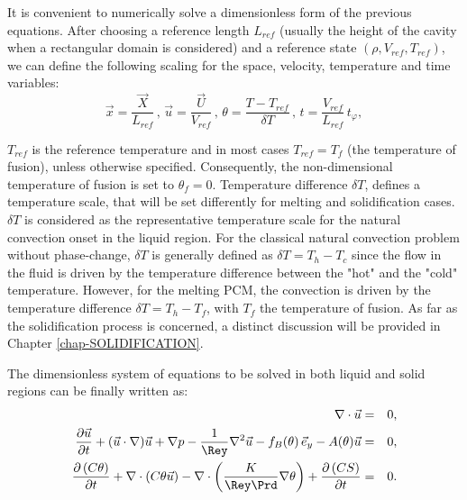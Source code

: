 It is convenient to numerically solve a dimensionless form of the previous equations.
After choosing a reference length $L_{ref}$ (usually the height of the cavity when a rectangular domain is considered) and a reference state $(\rho, V_{ref}, T_{ref})$, we can define the following scaling for the space, velocity, temperature and time variables:
\begin{equation}\label{eq-adim}
\vec{x} = \frac{\vec{X}}{L_{ref}} \, , \,  \vec{u} = \frac{\vec{U}}{V_{ref}} \, , \,  \theta = \frac{T-T_{ref}}{\delta T} \, , \,  t = \frac{V_{ref}}{L_{ref}} \, t_{\varphi},
\end{equation}

\noindent $T_{ref}$ is the reference temperature and in most cases $T_{ref} = T_f$ (the temperature of fusion), unless otherwise specified.
Consequently, the non-dimensional temperature of fusion is set to $\theta_f = 0$.
Temperature difference  $\delta T$, defines a temperature scale, that will be set differently for melting and solidification cases.
$\delta T$ is considered as the representative temperature scale  for the natural convection onset in the liquid region. 
For the classical natural convection problem without phase-change, $\delta T$ is generally defined as $\delta T=T_{h}-T_{c}$ since the flow in the fluid is driven by the temperature difference between the "hot" and the "cold" temperature.
However, for the melting PCM, the convection is driven by the temperature difference $\delta T=T_{h}-T_{f}$, with $T_f$ the temperature of fusion.
As far as the solidification process is concerned, a distinct discussion will be provided in Chapter \ref{chap-SOLIDIFICATION}. 

The dimensionless system of equations to be solved in both liquid and solid regions can be finally written as:
\begin{eqnarray}
\nabla\cdot \vec{u}&=&0, \label{eq-qmvt} \\ \vspace{0.2cm}
 \frac{\partial \vec{u}}{\partial t} + {(\vec{u}\cdot\nabla) \vec{u}} +\nabla p -\frac{1}{\Rey}{\nabla^2 \vec{u}} 
 - f_B(\theta)\, \vec{e}_y - A(\theta) \vec{u}&=&0, \label{eq-qmvt-2} \\ \vspace{0.2cm}
 \frac{\partial \left(C \theta\right)}{\partial t} + \nabla \cdot\left( C \theta \vec{u}\right) -
 \nabla \cdot\left( \frac{K}{\Rey \Prd} \nabla \theta \right) +  \frac{\partial \left(C S\right)}{\partial t}  &=& 0. \label{eq-energ} 
\end{eqnarray}

